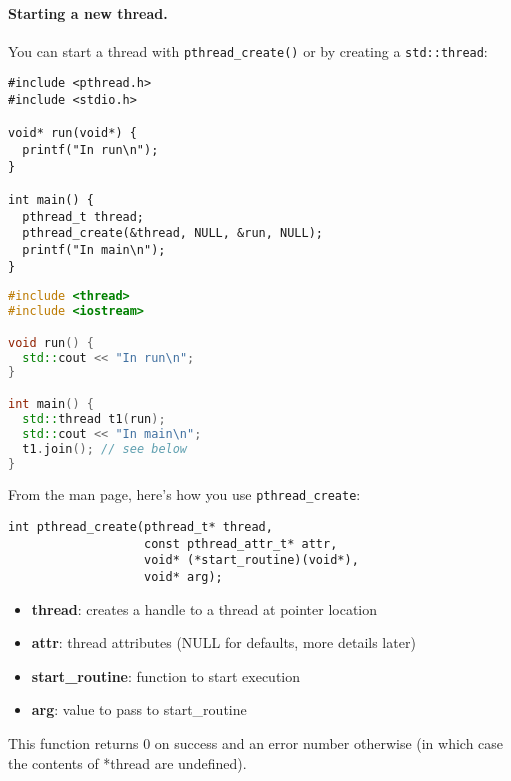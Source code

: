 \documentclass[11pt]{article}
\begin{document}
\paragraph{Starting a new thread.} You can start a thread with
\verb+pthread_create()+ or by creating a \verb+std::thread+:

{\small
  \begin{minipage}{.55\textwidth}
\begin{lstlisting}
#include <pthread.h>
#include <stdio.h>

void* run(void*) {
  printf("In run\n");
}

int main() {
  pthread_t thread;
  pthread_create(&thread, NULL, &run, NULL);
  printf("In main\n");
}
\end{lstlisting}
  \end{minipage} 
  \begin{minipage}{.4\textwidth}
\begin{lstlisting}[language=C++]
#include <thread>
#include <iostream>

void run() {
  std::cout << "In run\n";
}

int main() {
  std::thread t1(run);
  std::cout << "In main\n";
  t1.join(); // see below
}
\end{lstlisting}
  \end{minipage}
}

From the man page, here's how you use \verb+pthread_create+:
\begin{lstlisting}
int pthread_create(pthread_t* thread, 
                   const pthread_attr_t* attr,
                   void* (*start_routine)(void*),
                   void* arg);
\end{lstlisting}

\begin{itemize}
\item  {\bf thread}: creates a handle to a thread at pointer location

\item  {\bf attr}: thread attributes (NULL for defaults, more details later)

\item  {\bf start\_routine}: function to start execution

\item   {\bf arg}: value to pass to start\_routine
\end{itemize}

This function returns 0 on success and an error number otherwise (in
which case the contents of *thread are undefined).
\end{document}
